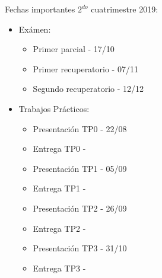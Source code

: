 \documentclass[9pt,a4paper]{article}
\begin{document}
Fechas importantes $2^{do}$ cuatrimestre 2019:

\begin{itemize}
\item Exámen:
\begin{itemize}
\item Primer parcial - 17/10
\item Primer recuperatorio - 07/11
\item Segundo recuperatorio - 12/12
\end{itemize}
\item Trabajos Prácticos:
\begin{itemize}
\item Presentación TP0 - 22/08
\item Entrega TP0 - 
\item Presentación TP1 - 05/09
\item Entrega TP1 - 
\item Presentación TP2 - 26/09
\item Entrega TP2 - 
\item Presentación TP3 - 31/10
\item Entrega TP3 - 

\end{itemize}

\end{itemize}
\end{document}
